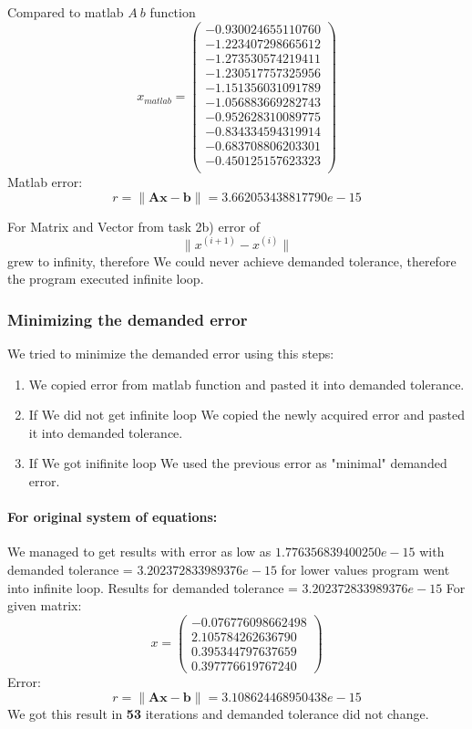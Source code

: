 \documentclass[12pt]{report}
\begin{document}
Compared to matlab $ A \ b $ function
\[ x_{matlab} = \left( \begin{array}{cc}
  -0.930024655110760 \\
  -1.223407298665612 \\
  -1.273530574219411 \\
  -1.230517757325956 \\
  -1.151356031091789 \\
  -1.056883669282743 \\
  -0.952628310089775 \\
  -0.834334594319914 \\
  -0.683708806203301 \\
  -0.450125157623323 \\
\end{array} \right)
\]
Matlab error:
\[ r = \| \mathbf{A}\mathbf{x} - \mathbf{b}\| = 3.662053438817790e-15 \]

For Matrix and Vector from task 2b) error of
\[ \| x^{(i+1)} - x^{(i)} \| \]
grew to infinity, therefore We could never achieve demanded tolerance, therefore the program executed infinite loop.

\subsubsection{Minimizing the demanded error}
We tried to minimize the demanded error using this steps:
\begin{enumerate}
\item We copied error from matlab function and pasted it into demanded tolerance.
\item If We did not get infinite loop We copied the newly acquired error and pasted it into demanded tolerance.
\item If We got inifinite loop We used the previous error as "minimal" demanded error.
\end{enumerate}
\paragraph{For original system of equations:}
We managed to get results with error as low as $1.776356839400250e-15$ with demanded tolerance = $3.202372833989376e-15$ for lower values program went into infinite loop.
Results for demanded tolerance = $3.202372833989376e-15$
For given matrix:
\[ x = \left( \begin{array}{cc}
  -0.076776098662498 \\
   2.105784262636790 \\
   0.395344797637659 \\
   0.397776619767240
\end{array} \right)
\]
Error:
\[ r = \| \mathbf{A}\mathbf{x} - \mathbf{b}\| = 3.108624468950438e-15 \]
We got this result in \textbf{53} iterations and demanded tolerance did not change.
\end{document}

